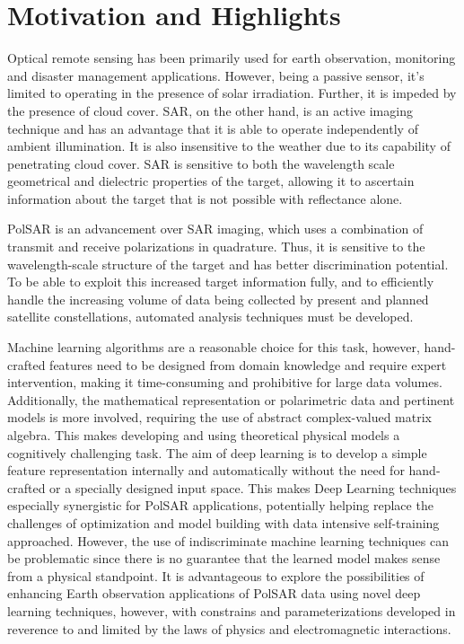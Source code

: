 \section{Motivation and Highlights}

Optical remote sensing has been primarily used for earth observation, monitoring and disaster management applications. However, being a passive sensor, it's limited to operating in the presence of solar irradiation. Further, it is impeded by the presence of cloud cover. SAR, on the other hand, is an active imaging technique and has an advantage that it is able to operate independently of ambient illumination. It is also insensitive to the weather due to its capability of penetrating cloud cover. SAR is sensitive to both the wavelength scale geometrical and dielectric properties of the target, allowing it to ascertain information about the target that is not possible with reflectance alone. 

PolSAR is an advancement over SAR imaging, which uses a combination of transmit and receive polarizations in quadrature. Thus, it is sensitive to the wavelength-scale structure of the target and has better discrimination potential. To be able to exploit this increased target information fully, and to efficiently handle the increasing volume of data being collected by present and planned satellite constellations, automated analysis techniques must be developed. 

Machine learning algorithms are a reasonable choice for this task, however, hand-crafted features need to be designed from domain knowledge and require expert intervention, making it time-consuming and prohibitive for large data volumes. Additionally, the mathematical representation or polarimetric data and pertinent models is more involved, requiring the use of abstract complex-valued matrix algebra. This makes developing and using theoretical physical models a cognitively challenging task. The aim of deep learning is to develop a simple feature representation internally and automatically without the need for hand-crafted or a specially designed input space. This makes Deep Learning techniques especially synergistic for PolSAR applications, potentially helping replace the challenges of optimization and model building with data intensive self-training approached. However, the use of indiscriminate machine learning techniques can be problematic since there is no guarantee that the learned model makes sense from a physical standpoint. It is advantageous to explore the possibilities of enhancing Earth observation applications of PolSAR data using novel deep learning techniques, however, with constrains and parameterizations developed in reverence to and limited by the laws of physics and electromagnetic interactions.


